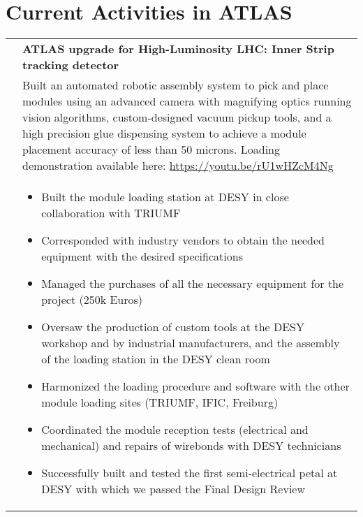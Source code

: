\documentclass[a4paper,10pt]{article}
\begin{document}
\section{Current Activities in ATLAS}
\begin{tabularx}{\textwidth}{>{\centering\arraybackslash}X p{} }
{\bf Upgrade} &   \textbf{ATLAS upgrade for High-Luminosity LHC: Inner Strip tracking detector} \\
	& Built an automated robotic assembly system to pick and place modules using an advanced camera with magnifying optics running vision algorithms, custom-designed vacuum pickup tools, and a high precision glue dispensing system to achieve a module placement accuracy of less than 50 microns. Loading demonstration available here: \href{https://youtu.be/rU1wHZcM4Ng}{https://youtu.be/rU1wHZcM4Ng} \\
			& \begin{itemize}
			   \item Built the module loading station at DESY in close collaboration with TRIUMF
			   \item Corresponded with industry vendors to obtain the needed equipment with the desired specifications
			   \item Managed the purchases of all the necessary equipment for the project (250k Euros)
			   \item Oversaw the production of custom tools at the DESY workshop and by industrial manufacturers, and the assembly of the loading station in the DESY clean room
			   \item Harmonized the loading procedure and software with the other module loading sites (TRIUMF, IFIC, Freiburg)
         \item Coordinated the module reception tests (electrical and mechanical) and repairs of wirebonds with DESY technicians
         \item Successfully built and tested the first semi-electrical petal at DESY with which we passed the Final Design Review
			 \end{itemize} \\[-1.5ex]


\end{tabularx}
\end{document}
